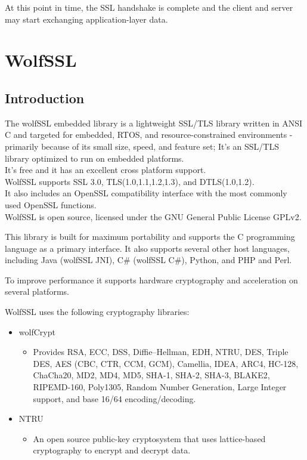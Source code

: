 \documentclass[a4paper,12pt]{report}
\begin{document}
\begin{itemize}
\begin{enumerate}
\end{enumerate}
\end{itemize}

At this point in time, the SSL handshake is complete and the client and server may start exchanging application-layer data.

\chapter{WolfSSL}
\section{Introduction}

The wolfSSL embedded library is a lightweight SSL/TLS library written in ANSI C and targeted for embedded, RTOS, and resource-constrained
environments - primarily because of its small size, speed, and feature set; It's an SSL/TLS library optimized to run on embedded platforms.
\\It's free and it has an excellent cross platform support.
\\WolfSSL supports SSL 3.0, TLS(1.0,1.1,1.2,1.3), and DTLS(1.0,1.2).
\\It also includes an OpenSSL compatibility interface with the most commonly used OpenSSL functions.
\\WolfSSL is open source, licensed under the GNU General Public License GPLv2.

\vspace{5mm} %
This library is built for maximum portability and supports the C programming language as a primary interface. It also supports several other host languages, including Java (wolfSSL JNI), C\# (wolfSSL C\#), Python, and PHP and Perl.

\vspace{5mm} %
To improve performance it supports hardware cryptography and acceleration on several platforms.

\vspace{5mm} %
WolfSSL uses the following cryptography libraries:
\begin{itemize}
\item wolfCrypt
\begin{itemize}
\item Provides RSA, ECC, DSS, Diffie–Hellman, EDH, NTRU, DES, Triple DES, AES (CBC, CTR, CCM, GCM), Camellia, IDEA, ARC4, HC-128, ChaCha20, MD2, MD4, MD5, SHA-1, SHA-2, SHA-3, BLAKE2, RIPEMD-160, Poly1305, Random Number Generation, Large Integer support, and base 16/64 encoding/decoding.
\end{itemize}
\item NTRU
\begin{itemize}
\item An open source public-key cryptosystem that uses lattice-based cryptography to encrypt and decrypt data. 
\end{itemize}
\end{itemize}
\end{document}
